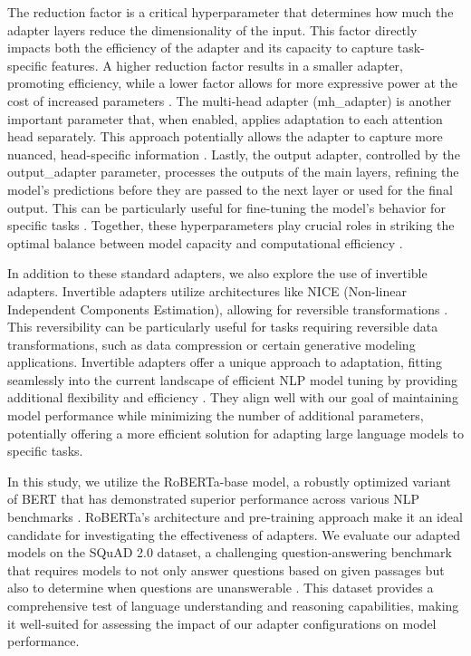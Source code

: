 \documentclass[conference]{IEEEtran}
\begin{document}
The reduction factor is a critical hyperparameter that determines how much the adapter layers reduce the dimensionality of the input. This factor directly impacts both the efficiency of the adapter and its capacity to capture task-specific features. A higher reduction factor results in a smaller adapter, promoting efficiency, while a lower factor allows for more expressive power at the cost of increased parameters \cite{b11}. The multi-head adapter (mh\_adapter) is another important parameter that, when enabled, applies adaptation to each attention head separately. This approach potentially allows the adapter to capture more nuanced, head-specific information \cite{b12}. Lastly, the output adapter, controlled by the output\_adapter parameter, processes the outputs of the main layers, refining the model's predictions before they are passed to the next layer or used for the final output. This can be particularly useful for fine-tuning the model's behavior for specific tasks \cite{b12}. Together, these hyperparameters play crucial roles in striking the optimal balance between model capacity and computational efficiency \cite{b8,b11}. 

In addition to these standard adapters, we also explore the use of invertible adapters. Invertible adapters utilize architectures like NICE (Non-linear Independent Components Estimation), allowing for reversible transformations \cite{b13}. This reversibility can be particularly useful for tasks requiring reversible data transformations, such as data compression or certain generative modeling applications. Invertible adapters offer a unique approach to adaptation, fitting seamlessly into the current landscape of efficient NLP model tuning by providing additional flexibility and efficiency \cite{b14}. They align well with our goal of maintaining model performance while minimizing the number of additional parameters, potentially offering a more efficient solution for adapting large language models to specific tasks.

In this study, we utilize the RoBERTa-base model, a robustly optimized variant of BERT that has demonstrated superior performance across various NLP benchmarks \cite{b4}. RoBERTa's architecture and pre-training approach make it an ideal candidate for investigating the effectiveness of adapters. We evaluate our adapted models on the SQuAD 2.0 dataset, a challenging question-answering benchmark that requires models to not only answer questions based on given passages but also to determine when questions are unanswerable \cite{b15}. This dataset provides a comprehensive test of language understanding and reasoning capabilities, making it well-suited for assessing the impact of our adapter configurations on model performance.
\end{document}
